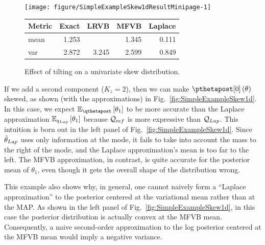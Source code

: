 \documentclass{article}\usepackage[]{graphicx}\usepackage[]{color}
\newenvironment{knitrout}{}{}
\theoremstyle{definition}
\theoremstyle{plain}
\theoremstyle{plain}
\theoremstyle{plain}
\theoremstyle{definition}
\theoremstyle{plain}
\theoremstyle{plain}
\newcommand{\fig}[1]{Fig.~\ref{fig:#1}}
\begin{document}
\begin{figure}
\noindent\begin{minipage}[b]{1\columnwidth}
\begin{minipage}[c][1\totalheight][b]{0.49\columnwidth}\begin{knitrout}
\color{fgcolor}

{\centering \texttt{[image: figure/SimpleExampleSkew1dResultMinipage-1]} 

}



\end{knitrout}
\end{minipage}
\begin{minipage}[b]{0.49\columnwidth}\begin{center}\begin{tabular}{lrrrr}
  \hline
Metric & Exact & LRVB & MFVB & Laplace \\ 
  \hline
mean & 1.253 &  & 1.345 & 0.111 \\ 
  var & 2.872 & 3.245 & 2.599 & 0.849 \\ 
   \hline
\end{tabular}
\end{center}
\end{minipage}

\end{minipage}
\caption{Effect of tilting on a univariate skew distribution. \label{fig:SimpleExampleSkew1dResult}}
\end{figure}


If we add a second component ($K_{z}=2$), then we can make
$\pzeropost\left(\theta\right)$
skewed, as shown (with the approximations) in \fig{SimpleExampleSkew1d}.
In this case, we expect $\mbe_{\qthetapost}\left[\theta_{1}\right]$
to be more accurate than the Laplace approximation
$\mathbb{E}_{q_{Lap}}\left[\theta_{1}\right]$
because $\mathcal{Q}_{mf}$ is more expressive than $\mathcal{Q}_{Lap}$. This intuition
is born out in the left panel of \fig{SimpleExampleSkew1d}. Since
$\hat{\theta}_{Lap}$ uses only information at the mode, it fails to take into
account the mass to the right of the mode, and the Laplace approximation's
mean is too far to the left. The MFVB approximation, in contrast, is
quite accurate for the posterior mean of $\theta_{1}$, even though
it gets the overall shape of the distribution wrong.

This example also shows why, in general, one cannot naively form a
``Laplace approximation'' to the posterior centered at the variational
mean rather than at the MAP. As shown in the left panel of \fig{SimpleExampleSkew1d},
in this case the posterior distribution is actually convex at the
MFVB mean. Consequently, a naive second-order approximation to the log
posterior centered at the MFVB mean would imply a negative variance.
\end{document}
